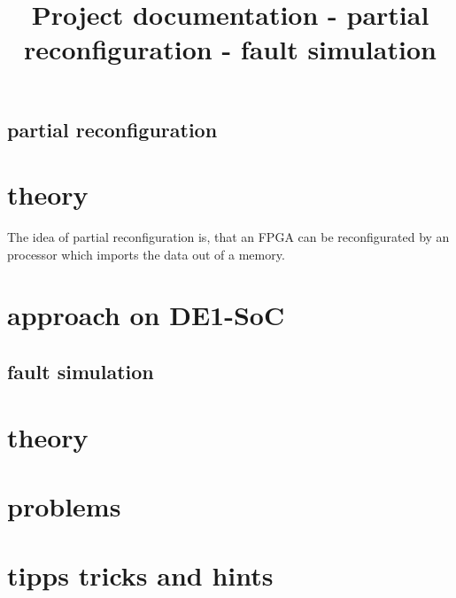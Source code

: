 \documentclass[10pt,a4paper]{report}
\begin{document}
\title{Project documentation - partial reconfiguration - fault simulation}
\section{partial reconfiguration}
\chapter{theory}
The idea of partial reconfiguration is, that an FPGA can be reconfigurated by an processor which imports the data out of a memory.
\chapter{approach on DE1-SoC}

\section{fault simulation}
\chapter{theory}
\chapter{problems}
\chapter{tipps tricks and hints}
\end{document}
